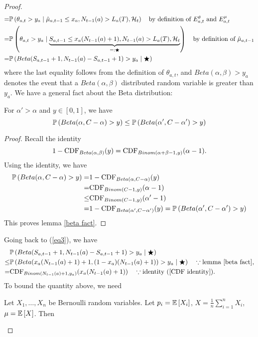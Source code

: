 \documentclass[11pt]{article}
\begin{document}
\begin{proof}
\begin{align}
    =& \mathbb{P}\left(  \theta_{a,t} > y_a \mid \hat{\mu}_{a,t-1} \le x_a, N_{t-1}(a) > L_a(T), \mathcal{H}_t \right) \quad \mbox{by definition of $E^{\theta}_{a,t}$ and $E^\mu_{a,t}$} \\
    =& \mathbb{P}\left(  \theta_{a,t} > y_a \mid \underbrace{S_{a,t-1} \le x_a(N_{t-1}(a)+1), N_{t-1}(a) > L_a(T), \mathcal{H}_t}_{=:\bigstar} \right) \quad \mbox{by definition of $\hat{\mu}_{a,t-1}$} \\
    =& \mathbb{P}\left(  Beta(S_{a,t-1}+1,N_{t-1}(a)-S_{a,t-1}+1) > y_a \mid \bigstar \right) \label{eq3}
\end{align}
where the last equality follows from the definition of $\theta_{a,t}$, and $Beta(\alpha,\beta) > y_a$ denotes the event that a $Beta(\alpha,\beta)$ distributed random variable is greater than $y_a$. We have a general fact about the Beta distribution:
\begin{lemma}\label{beta fact}For $\alpha'>\alpha$ and $y\in [0,1]$, we have
$$\mathbb{P}\left( Beta(\alpha, C-\alpha)>y \right) \le \mathbb{P}\left( Beta(\alpha',C-\alpha')>y \right)$$ 
\end{lemma}
\begin{proof}
Recall the identity
\begin{equation}\label{CDF identity}
1- \mathrm{CDF}_{Beta(\alpha,\beta)}(y) = \mathrm{CDF}_{Binom(\alpha+\beta-1,y)}(\alpha-1).
\end{equation}
Using the identity, we have
\begin{align*}\mathbb{P}\left( Beta(\alpha, C-\alpha)>y \right) =& 1- \mathrm{CDF}_{Beta(\alpha,C-\alpha)}(y)\\
=& \mathrm{CDF}_{Binom(C-1,y)}(\alpha-1)\\
\le& \mathrm{CDF}_{Binom(C-1,y)}(\alpha'-1)\\
=& 1- \mathrm{CDF}_{Beta(\alpha',C-\alpha')}(y)=\mathbb{P}\left( Beta(\alpha', C-\alpha')>y \right)
\end{align*}
This proves lemma \ref{beta fact}.
\end{proof}
Going back to (\ref{eq3}), we have
\begin{align}&\mathbb{P}\left(  Beta(S_{a,t-1}+1,N_{t-1}(a)-S_{a,t-1}+1) > y_a \mid \bigstar \right)\\
\le& \mathbb{P}\left(  Beta(x_a(N_{t-1}(a)+1)+1,(1-x_a)(N_{t-1}(a)+1)) > y_a \mid \bigstar \right)\quad \because \mbox{lemma \ref{beta fact},}\\
=&\mathrm{CDF}_{Binom(N_{t-1}(a)+1,y_a)}(x_a(N_{t-1}(a)+1)) \quad \because \mbox{identity (\ref{CDF identity}).}\label{eq4}\end{align}
To bound the quantity above, we need
\begin{lemma}\label{KL lemma}
Let $X_1,\dots, X_n$ be Bernoulli random variables. Let $p_i = \mathbb{E}\left[ X_i \right]$, $X=\frac{1}{n} \sum_{i=1}^n X_i$, $\mu = \mathbb{E}\left[ X \right]$. Then

\end{lemma}
\end{proof}
\end{document}
